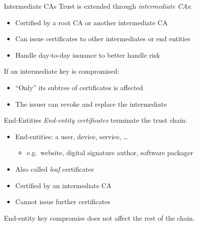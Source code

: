 \begin{frame}{Intermediate CAs}
    Trust is extended through \emph{intermediate CAs}:
    \begin{itemize}[<+(1)->]
      \item Certified by a root CA or another intermediate CA
      \item Can issue certificates to other intermediates or end entities
      \item Handle day-to-day issuance to better handle risk
    \end{itemize}

    \vspace*{1em}

    \pause
    If an intermediate key is compromised:
    \begin{itemize}[<+(1)->]
      \item \enquote{Only} its subtree of certificates is affected
      \item The issuer can revoke and replace the intermediate
    \end{itemize}
\end{frame}

\begin{frame}{End-Entities}
  \emph{End-entity certificates} terminate the trust chain:
  \begin{itemize}[<+(1)->]
    \item End-entities: a user, device, service, \dots
    \par
    \begin{itemize}
      \item e.g.\ website, digital signature author, software packager
    \end{itemize}
    \item Also called \emph{leaf} certificates
    \item Certified by an intermediate CA
    \item Cannot issue further certificates
  \end{itemize}

  \vspace*{1em}

  \pause
  End-entity key compromise does not affect the rest of the chain.
\end{frame}

